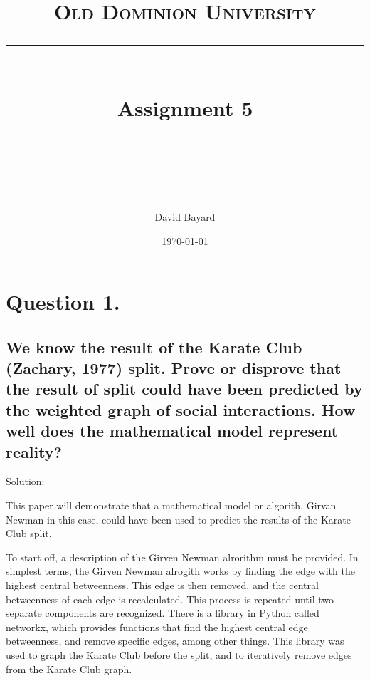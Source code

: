 \documentclass[11pt]{article} %
\title{
	\normalfont\normalsize
	\textsc{Old Dominion University}\\ %
	\vspace{25pt} %
	\rule{\linewidth}{0.5pt}\\ %
	\vspace{20pt} %
	{\huge Assignment 5}\\ %
	\vspace{12pt} %
	\rule{\linewidth}{2pt}\\ %
	\vspace{12pt} %
}
\author{\LARGE David Bayard} %
\date{\normalsize\today} %
\begin{document}

\lstset{style=pythonStyle}


\maketitle %

\pagebreak
\section*{Question 1.}




\subsection*{We know the result of the Karate Club (Zachary, 1977) split.
Prove or disprove that the result of split could have been predicted
by the weighted graph of social interactions.  How well does the
mathematical model represent reality?}
\bigskip\bigskip


\Large Solution:
\newline \newline\small

\tabto{2.0cm} This paper will demonstrate that a mathematical model or algorith, Girvan Newman in this case, could have been used to predict the results of the Karate Club split. \newline \newline

\tabto{2.0cm} To start off, a description of the Girven Newman alrorithm must be provided. In simplest terms, the Girven Newman alrogith works by finding the edge with the highest central betweenness. This edge is then removed, and the central betweenness of each edge is recalculated. This process is repeated until two separate components are recognized. There is a library in Python called networkx, which provides functions that find the highest central edge betweenness, and remove specific edges, among other things. This library was used to graph the Karate Club before the split, and to iteratively remove edges from the Karate Club graph. \newline \newline
\end{document}
